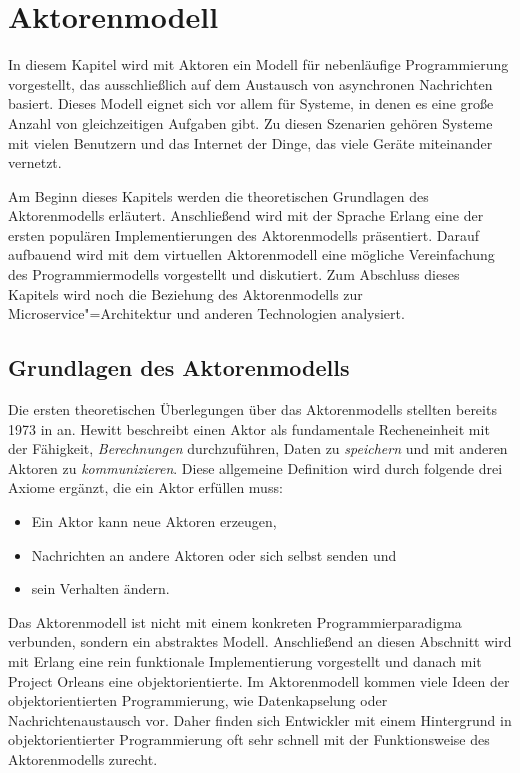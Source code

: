 \chapter{Aktorenmodell}
\label{chap:actormodel}

In diesem Kapitel wird mit Aktoren ein Modell für nebenläufige Programmierung vorgestellt, das ausschließlich auf dem Austausch von asynchronen Nachrichten basiert. Dieses Modell eignet sich vor allem für Systeme, in denen es eine große Anzahl von gleichzeitigen Aufgaben gibt. Zu diesen Szenarien gehören Systeme mit vielen Benutzern und das Internet der Dinge, das viele  Geräte miteinander vernetzt.

Am Beginn dieses Kapitels werden die theoretischen Grundlagen des Aktorenmodells erläutert. Anschließend wird mit der Sprache Erlang eine der ersten populären Implementierungen des Aktorenmodells präsentiert. Darauf aufbauend wird mit dem virtuellen Aktorenmodell eine mögliche Vereinfachung des Programmiermodells vorgestellt und diskutiert. Zum Abschluss dieses Kapitels wird noch die Beziehung des Aktorenmodells zur Microservice"=Architektur und anderen Technologien analysiert.

\section{Grundlagen des Aktorenmodells}
\label{sec:actor-model}

Die ersten theoretischen Überlegungen über das Aktorenmodells stellten \citeauthor{Hewitt:1973:UMA:1624775.1624804} bereits 1973 in \cite{Hewitt:1973:UMA:1624775.1624804} an. Hewitt beschreibt einen Aktor als fundamentale Recheneinheit mit der Fähigkeit, \textit{Berechnungen} durchzuführen, Daten zu \textit{speichern} und mit anderen Aktoren zu \textit{kommunizieren}. Diese allgemeine Definition wird durch folgende drei Axiome ergänzt, die ein Aktor erfüllen muss:

\begin{itemize}
	\item Ein Aktor kann neue Aktoren erzeugen,
	\item Nachrichten an andere Aktoren oder sich selbst senden und
	\item sein Verhalten ändern.
\end{itemize}

\noindent
Das Aktorenmodell ist nicht mit einem konkreten Programmierparadigma verbunden, sondern ein abstraktes Modell. Anschließend an diesen Abschnitt wird mit Erlang eine rein funktionale Implementierung vorgestellt und danach mit Project Orleans eine objektorientierte. Im Aktorenmodell kommen viele Ideen der objektorientierten Programmierung, wie \zB Datenkapselung oder Nachrichtenaustausch vor. Daher finden sich Entwickler mit einem Hintergrund in objektorientierter Programmierung oft sehr schnell mit der Funktionsweise des Aktorenmodells zurecht.

